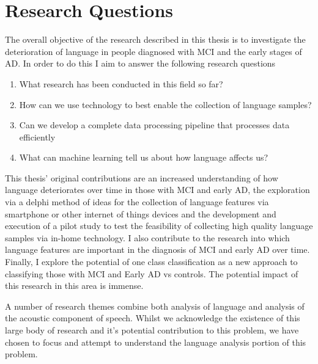 \documentclass[10pt, letterpaper, twoside, openany]{thesis}
\begin{document}
\section{Research Questions}
The overall objective of the research described in this thesis is to investigate the deterioration of language in people diagnosed with MCI and the early stages of AD. In order to do this I aim to answer the following research questions
\begin{enumerate}
	\item What research has been conducted in this field so far?
	\item How can we use technology to best enable the collection of language samples?
	\item Can we develop a complete data processing pipeline that processes data efficiently
	\item What can machine learning tell us about how language affects us?
\end{enumerate} 
\par 
This thesis' original contributions are an increased understanding of how language deteriorates over time in those with MCI and early AD, the exploration via a delphi method of ideas for the collection of language features via smartphone or other internet of things devices and the development and execution of a pilot study to test the feasibility of collecting high quality language samples via in-home technology. I also contribute to the research into which language features are important in the diagnosis of MCI and early AD over time. Finally, I explore the potential of one class classification as a new approach to classifying those with MCI and Early AD vs controls. The potential impact of this research in this area is immense. 
\par 
A number of research themes combine both analysis of language and analysis of the acoustic component of speech. Whilst we acknowledge the existence of this large body of research and it's potential contribution to this problem, we have chosen to focus and attempt to understand the language analysis portion of this problem. 
\end{document}
